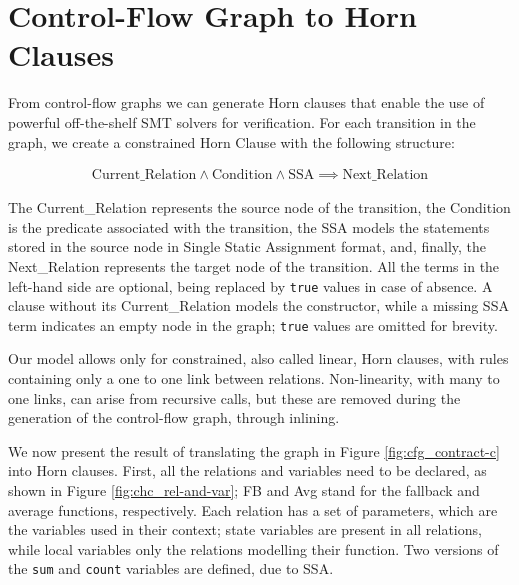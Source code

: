 \section{Control-Flow Graph to Horn Clauses}

From control-flow graphs we can generate Horn clauses that enable the use of powerful off-the-shelf SMT solvers for verification. For each transition in the graph, we create a constrained Horn Clause with the following structure:

\begin{align*}
\text{Current\_Relation} \land \text{Condition} \land \text{SSA} \implies \text{Next\_Relation}
\end{align*}

The Current\_Relation represents the source node of the transition, the Condition is the predicate associated with the transition, the SSA models the statements stored in the source node in Single Static Assignment format, and, finally, the Next\_Relation represents the target node of the transition. All the terms in the left-hand side are optional, being replaced by \texttt{true} values in case of absence. A clause without its Current\_Relation models the constructor, while a missing SSA term indicates an empty node in the graph; \texttt{true} values are omitted for brevity.

Our model allows only for constrained, also called linear, Horn clauses, with rules containing only a one to one link between relations. Non-linearity, with many to one links, can arise from recursive calls, but these are removed during the generation of the control-flow graph, through inlining.

We now present the result of translating the graph in Figure \ref{fig:cfg_contract-c} into Horn clauses. First, all the relations and variables need to be declared, as shown in Figure \ref{fig:chc_rel-and-var}; FB and Avg stand for the fallback and average functions, respectively. Each relation has a set of parameters, which are the variables used in their context; state variables are present in all relations, while local variables only the relations modelling their function. Two versions of the \texttt{sum} and \texttt{count} variables are defined, due to SSA.

